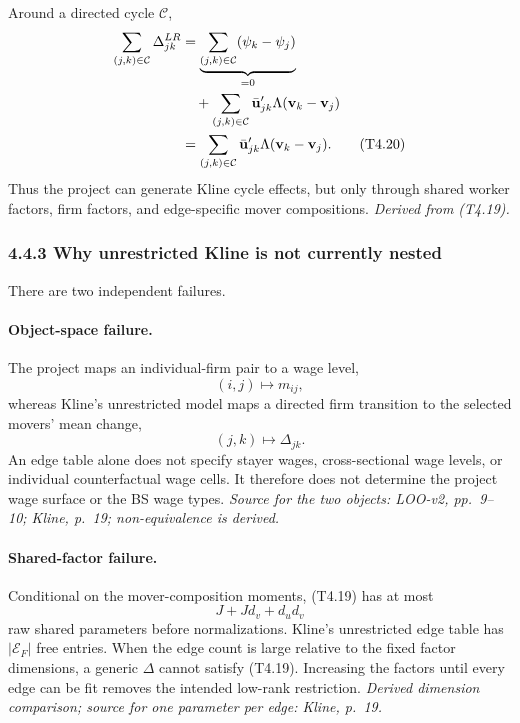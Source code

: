\documentclass[11pt]{article}
\begin{document}
Around a directed cycle \(\mathcal C\),
\begin{align}
\sum_{(j,k)\in\mathcal C}\Delta_{jk}^{LR}
&=
\underbrace{
\sum_{(j,k)\in\mathcal C}(\psi_k-\psi_j)
}_{=0}
\notag\\
&\quad+
\sum_{(j,k)\in\mathcal C}
\bar{\mathbf u}_{jk}'\Lambda
(\mathbf v_k-\mathbf v_j) \notag\\
&=
\sum_{(j,k)\in\mathcal C}
\bar{\mathbf u}_{jk}'\Lambda
(\mathbf v_k-\mathbf v_j).
\tag{T4.20}
\end{align}
Thus the project can generate Kline cycle effects, but only through shared
worker factors, firm factors, and edge-specific mover compositions.
\textit{Derived from (T4.19).}

\subsubsection{4.4.3 Why unrestricted Kline is not currently nested}

There are two independent failures.

\paragraph{Object-space failure.}
The project maps an individual-firm pair to a wage level,
\[
(i,j)\longmapsto m_{ij},
\]
whereas Kline's unrestricted model maps a directed firm transition to the
selected movers' mean change,
\[
(j,k)\longmapsto\Delta_{jk}.
\]
An edge table alone does not specify stayer wages, cross-sectional wage levels,
or individual counterfactual wage cells.  It therefore does not determine the
project wage surface or the BS wage types.
\textit{Source for the two objects: LOO-v2, pp.\ 9--10; Kline, p.\ 19;
non-equivalence is derived.}

\paragraph{Shared-factor failure.}
Conditional on the mover-composition moments, (T4.19) has at most
\[
J+Jd_v+d_ud_v
\tag{T4.21}
\]
raw shared parameters before normalizations.  Kline's unrestricted edge table
has \(|\mathcal E_F|\) free entries.  When the edge count is large relative to
the fixed factor dimensions, a generic \(\Delta\) cannot satisfy (T4.19).
Increasing the factors until every edge can be fit removes the intended
low-rank restriction.
\textit{Derived dimension comparison; source for one parameter per edge:
Kline, p.\ 19.}
\end{document}
